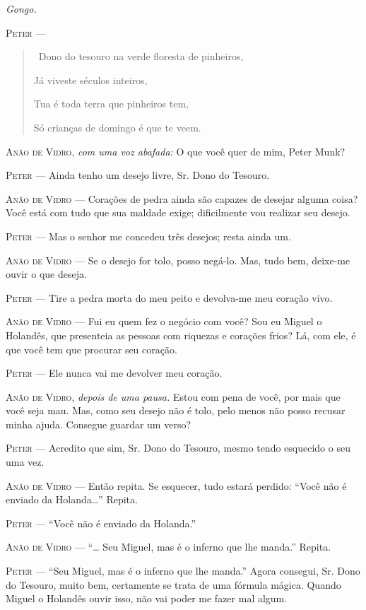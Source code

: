 \begin{myparindent}{0pt}
\begin{Parskip}
\emph{Gongo.}

\textsc{Peter} ---

\begin{quote}
\quad \, Dono do tesouro na verde floresta de pinheiros,

Já viveste séculos inteiros,

Tua é toda terra que pinheiros tem,

Só crianças de domingo é que te veem.
\end{quote}

\textsc{Anão de Vidro}, \emph{com uma voz abafada:} O que você quer de mim, Peter
Munk?

\textsc{Peter} --- Ainda tenho um desejo livre, Sr. Dono do Tesouro.

\textsc{Anão de Vidro} --- Corações de pedra ainda são capazes de desejar alguma
coisa? Você está com tudo que sua maldade exige; dificilmente vou
realizar seu desejo.

\textsc{Peter} --- Mas o senhor me concedeu três desejos; resta ainda um.

\textsc{Anão de Vidro} --- Se o desejo for tolo, posso negá-lo. Mas, tudo bem,
deixe-me ouvir o que deseja.

\textsc{Peter} --- Tire a pedra morta do meu peito e devolva-me meu coração vivo.

\textsc{Anão de Vidro} --- Fui eu quem fez o negócio com você? Sou eu Miguel o
Holandês, que presenteia as pessoas com riquezas e corações frios? Lá,
com ele, é que você tem que procurar seu coração.

\textsc{Peter} --- Ele nunca vai me devolver meu coração.

\textsc{Anão de Vidro}, \emph{depois de uma pausa.} Estou com pena de você, por
mais que você seja mau. Mas, como seu desejo não é tolo, pelo menos não
posso recusar minha ajuda. Consegue guardar um verso?

\textsc{Peter} --- Acredito que sim, Sr. Dono do Tesouro, mesmo tendo esquecido o
seu uma vez.

\textsc{Anão de Vidro} --- Então repita. Se esquecer, tudo estará perdido: ``Você
não é enviado da Holanda\ldots{}'' Repita.

\textsc{Peter} --- ``Você não é enviado da Holanda.''

\textsc{Anão de Vidro} --- ``\ldots{} Seu Miguel, mas é o inferno que lhe manda.''
Repita.

\textsc{Peter} --- ``Seu Miguel, mas é o inferno que lhe manda.'' Agora consegui,
Sr. Dono do Tesouro, muito bem, certamente se trata de uma fórmula
mágica. Quando Miguel o Holandês ouvir isso, não vai poder me fazer mal
algum.


\end{Parskip}
\end{myparindent}
